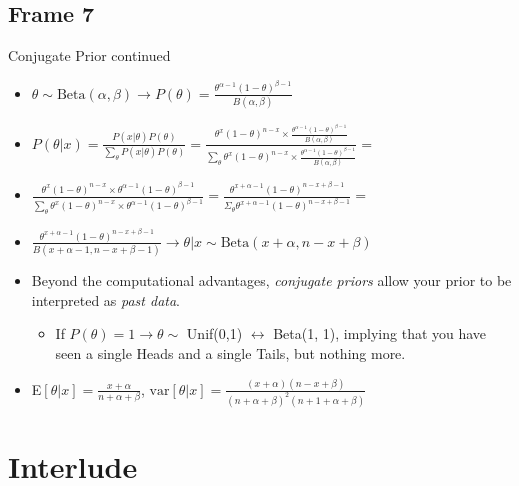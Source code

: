 \documentclass[xcolor=x11names,compress]{beamer}
\renewcommand{\(}{\begin{columns}}
\renewcommand{\)}{\end{columns}}
\newcommand{\<}[1]{\begin{column}{#1}}
\renewcommand{\>}{\end{column}}
\begin{document}
\subsection{Frame 7}
\begin{frame}{Conjugate Prior continued}
\begin{itemize}
\item $\theta \sim \text{Beta}(\alpha, \beta) \rightarrow P(\theta)= \frac{\theta^{\alpha - 1}(1-\theta)^{\beta - 1}}{B(\alpha, \beta)}$
\pause \item $P(\theta | x)=\frac{P(x|\theta)P(\theta)}{\sum_\theta P(x|\theta)P(\theta)}=\frac{\theta^x(1-\theta)^{n-x} \times \frac{\theta^{\alpha - 1}(1-\theta)^{\beta - 1}}{B(\alpha, \beta)}}{\sum_\theta \theta^x(1-\theta)^{n-x} \times \frac{\theta^{\alpha - 1}(1-\theta)^{\beta - 1}}{B(\alpha, \beta)}}=$
\pause \item[] $\frac{\theta^x(1-\theta)^{n-x} \times \theta^{\alpha - 1}(1-\theta)^{\beta - 1}}{\sum_\theta \theta^x(1-\theta)^{n-x} \times \theta^{\alpha - 1}(1-\theta)^{\beta - 1}}=\frac{\theta^{x + \alpha - 1}(1-\theta)^{n- x + \beta - 1}}{\Sigma_\theta \theta^{x + \alpha - 1}(1-\theta)^{n- x + \beta - 1}}=$
\pause \item[] $\frac{\theta^{x + \alpha - 1}(1-\theta)^{n- x + \beta - 1}}{B(x+\alpha - 1, n-x+\beta-1)} \rightarrow \theta|x \sim \text{Beta}(x+\alpha, n-x+\beta)$
\pause \item Beyond the computational advantages, \textit{conjugate priors} allow your prior to be interpreted as \textit{past data}.
	\begin{itemize}
	\pause \item If $P(\theta)=1 \rightarrow \theta \sim$ Unif(0,1) $\leftrightarrow$ Beta(1, 1), implying that you have seen a single Heads and a single Tails, but nothing more.
	\end{itemize}
\pause \item E$[\theta | x]=\frac{x + \alpha}{n + \alpha + \beta}$, $\text{var}[\theta | x] = \frac{(x + \alpha)(n - x + \beta)}{(n + \alpha + \beta)^2(n + 1 + \alpha + \beta)}$
\end{itemize}
\end{frame}
\section{Interlude}
\end{document}
